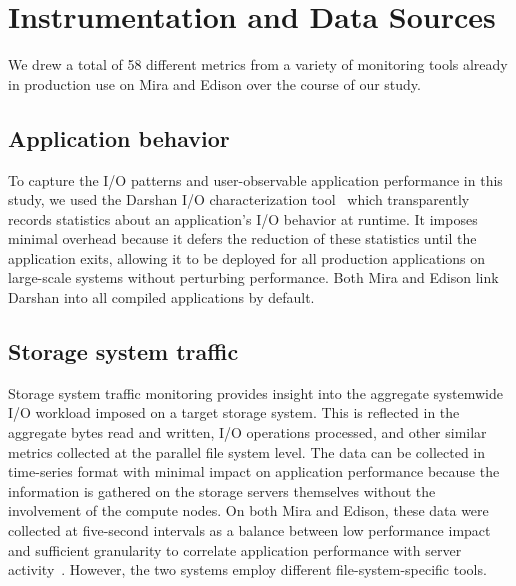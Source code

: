 \section{Instrumentation and Data Sources} \label{sec:methods}

We drew a total of 58 different metrics from a variety
of monitoring tools already in production use on Mira and Edison over the
course of our study.

\subsection{Application behavior} \label{sec:methods/darshan}

To capture the I/O patterns and user-observable application performance in this study, we used the Darshan I/O characterization tool~\cite{carns200924} which transparently records statistics about an application's I/O behavior at runtime.
It imposes minimal overhead because it defers the reduction of these statistics until the application exits,
allowing it to be deployed for all production applications on large-scale systems without perturbing performance.  Both Mira and Edison link Darshan into all compiled applications by default.

\subsection{Storage system traffic} \label{sec:methods/storagesystraffic}

Storage system traffic monitoring provides insight into the aggregate systemwide I/O workload imposed on a target storage system.
This is reflected in the aggregate bytes read and written, I/O operations processed, and other similar metrics collected at the parallel file system level.
The data can be collected in time-series format with minimal impact on application performance because the information is gathered on the storage servers themselves without the involvement of the compute nodes.
On both Mira and Edison, these data were collected at five-second intervals as a balance between low performance impact and sufficient granularity to correlate application performance with server activity~\cite{madireddy2017}.  However, the two systems employ different file-system-specific tools.  

